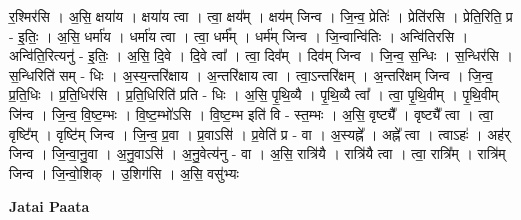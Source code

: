 \documentclass[17pt]{extarticle}
\begin{document}
र॒श्मिर॑सि । अ॒सि॒ क्षया॑य । क्षया॑य त्वा । त्वा॒ क्षय᳚म् । क्षय॑म् जिन्व । जि॒न्व॒ प्रेतिः॑ । प्रेति॑रसि । प्रेति॒रिति॒ प्र - इ॒तिः॒ । अ॒सि॒ धर्मा॑य । धर्मा॑य त्वा । त्वा॒ धर्म᳚म् । धर्म॑म् जिन्व । जि॒न्वान्वि॑तिः । अन्वि॑तिरसि । अन्वि॑ति॒रित्यनु॑ - इ॒तिः॒ । अ॒सि॒ दि॒वे । दि॒वे त्वा᳚ । त्वा॒ दिव᳚म् । दिव॑म् जिन्व । जि॒न्व॒ स॒न्धिः । स॒न्धिर॑सि । स॒न्धिरिति॑ सम् - धिः । अ॒स्य॒न्तरि॑क्षाय । अ॒न्तरि॑क्षाय त्वा । त्वा॒ऽन्तरि॑क्षम् । अ॒न्तरि॑क्षम् जिन्व । जि॒न्व॒ प्र॒ति॒धिः । प्र॒ति॒धिर॑सि । प्र॒ति॒धिरिति॑ प्रति - धिः । अ॒सि॒ पृ॒थि॒व्यै । पृ॒थि॒व्यै त्वा᳚ । त्वा॒ पृ॒थि॒वीम् । पृ॒थि॒वीम् जि॑न्व । जि॒न्व॒ वि॒ष्ट॒म्भः । वि॒ष्ट॒म्भो॑ऽसि । वि॒ष्ट॒म्भ इति॑ वि - स्त॒म्भः । अ॒सि॒ वृष्ट्यै᳚ । वृष्ट्यै᳚ त्वा । त्वा॒ वृष्टि᳚म् । वृष्टि॑म् जिन्व । जि॒न्व॒ प्र॒वा । प्र॒वाऽसि॑ । प्र॒वेति॑ प्र - वा । अ॒स्यह्ने᳚ । अह्ने᳚ त्वा । त्वाऽहः॑ । अह॑र् जिन्व । जि॒न्वा॒नु॒वा । अ॒नु॒वाऽसि॑ । अ॒नु॒वेत्य॑नु - वा । 
अ॒सि॒ रात्रि॑यै । रात्रि॑यै त्वा । त्वा॒ रात्रि᳚म् । रात्रि॑म् जिन्व । जि॒न्वो॒शिक् । उ॒शिग॑सि । अ॒सि॒ वसु॑भ्यः \newline

\textbf{Jatai Paata} \newline
\end{document}
